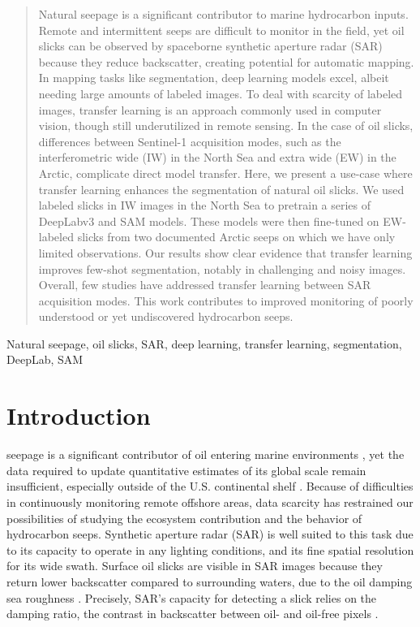 \documentclass[lettersize,journal]{IEEEtran}
\begin{document}
\begin{abstract} 
    Natural seepage is a significant contributor to marine hydrocarbon inputs. 
    Remote and intermittent seeps are difficult to monitor in the field, yet oil slicks can be observed by spaceborne synthetic aperture radar (SAR) because they reduce backscatter, 
    creating potential for automatic mapping. In mapping tasks like segmentation, deep learning models excel, albeit needing large amounts of labeled images.
    To deal with scarcity of labeled images, transfer learning is an approach commonly used in computer vision, though still underutilized in remote sensing. In the case of oil slicks, 
    differences between Sentinel-1 acquisition modes, such as the interferometric wide (IW) in the North Sea and extra wide (EW) in the Arctic, complicate direct model transfer.
    Here, we present a use-case where transfer learning enhances the segmentation of natural oil slicks. We used labeled slicks in IW images in the North Sea to pretrain a series of DeepLabv3 and SAM models. 
    These models were then fine-tuned on EW-labeled slicks from two documented Arctic seeps on which we have only limited observations. Our results show clear evidence that transfer learning improves few-shot 
    segmentation, notably in challenging and noisy images. Overall, few studies have addressed transfer learning between SAR acquisition modes. This work contributes to improved monitoring of poorly 
    understood or yet undiscovered hydrocarbon seeps. 
\end{abstract}

\begin{IEEEkeywords}
    Natural seepage, oil slicks, SAR, deep learning, transfer learning, segmentation, DeepLab, SAM
\end{IEEEkeywords}

\section{Introduction}
 seepage is a significant contributor of oil entering marine environments \cite{kvenvoldenNaturalSeepageCrude2003}, yet the data required to update quantitative
estimates of its global scale remain insufficient, especially outside of the U.S. continental shelf \cite{nationalacademiesofsciencesengineeringandmedicineOilSeaIV2022}. Because of difficulties in continuously monitoring 
remote offshore areas, data scarcity has restrained our possibilities of studying the ecosystem contribution and the behavior of hydrocarbon seeps. 
Synthetic aperture radar (SAR) is well suited to this task due to its capacity to operate in any lighting conditions, and its fine spatial resolution for its wide swath. 
Surface oil slicks are visible in SAR images because they return lower backscatter compared to surrounding waters, due to the oil damping sea roughness \cite{brekkeSAROilSpill2020,fingasReviewOilSpill2018,alpersOilsSurfactants2004}.
Precisely, SAR's capacity for detecting a slick relies on the damping ratio, the contrast in backscatter between oil- and oil-free pixels \cite{hovlandSlickDetectionSAR1994,
quigleyInvestigationDampingRatio2023}.
\end{document}
